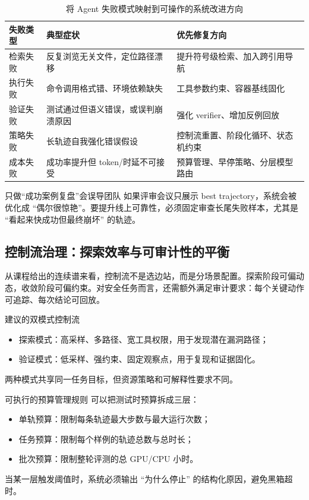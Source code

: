 \begin{table}[H]
\centering
\begin{tabular}{p{3.2cm}p{4.6cm}p{4.6cm}}
\toprule
\textbf{失败类型} & \textbf{典型症状} & \textbf{优先修复方向} \\
\midrule
检索失败 & 反复浏览无关文件，定位路径漂移 & 提升符号级检索、加入跨引用导航 \\
执行失败 & 命令调用格式错、环境依赖缺失 & 工具参数约束、容器基线固化 \\
验证失败 & 测试通过但语义错误，或误判崩溃原因 & 强化 verifier、增加反例回放 \\
策略失败 & 长轨迹自我强化错误假设 & 控制流重置、阶段化循环、状态机约束 \\
成本失败 & 成功率提升但 token/时延不可接受 & 预算管理、早停策略、分层模型路由 \\
\bottomrule
\end{tabular}
\caption{将 Agent 失败模式映射到可操作的系统改进方向}
\end{table}

\begin{warningbox}{只做“成功案例复盘”会误导团队}
如果评审会议只展示 best trajectory，系统会被优化成 ``偶尔很惊艳''。要提升线上可靠性，必须固定审查长尾失败样本，尤其是 ``看起来快成功但最终崩坏'' 的轨迹。
\end{warningbox}

\subsection{控制流治理：探索效率与可审计性的平衡}
从课程给出的连续谱来看，控制流不是选边站，而是分场景配置。探索阶段可偏动态，收敛阶段可偏约束。对安全任务而言，还需额外满足审计要求：每个关键动作可追踪、每次结论可回放。

\begin{importantbox}{建议的双模式控制流}
\begin{itemize}
    \item 探索模式：高采样、多路径、宽工具权限，用于发现潜在漏洞路径；
    \item 验证模式：低采样、强约束、固定观察点，用于复现和证据固化。
\end{itemize}
两种模式共享同一任务目标，但资源策略和可解释性要求不同。
\end{importantbox}

\begin{knowledgebox}{可执行的预算管理规则}
可以把测试时预算拆成三层：
\begin{itemize}
    \item 单轨预算：限制每条轨迹最大步数与最大运行次数；
    \item 任务预算：限制每个样例的轨迹总数与总时长；
    \item 批次预算：限制整轮评测的总 GPU/CPU 小时。
\end{itemize}
当某一层触发阈值时，系统必须输出 ``为什么停止'' 的结构化原因，避免黑箱超时。
\end{knowledgebox}

